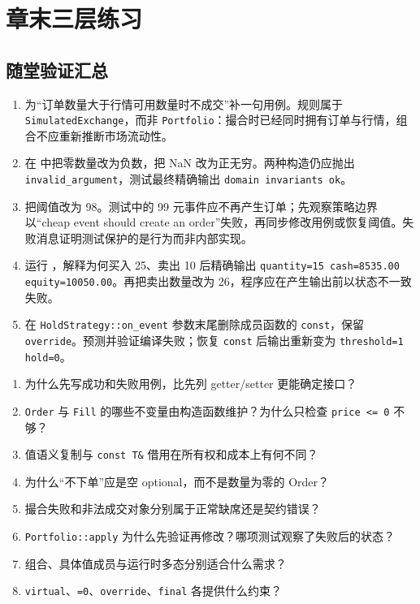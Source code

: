 \section{章末三层练习}

\subsection*{随堂验证汇总}

\begin{enumerate}
  \item 为“订单数量大于行情可用数量时不成交”补一句用例。规则属于 \texttt{SimulatedExchange}，而非 \texttt{Portfolio}：撮合时已经同时拥有订单与行情，组合不应重新推断市场流动性。
  \item 在  中把零数量改为负数，把 NaN 改为正无穷。两种构造仍应抛出 \texttt{invalid\_argument}，测试最终精确输出 \texttt{domain invariants ok}。
  \item 把阈值改为 98。测试中的 99 元事件应不再产生订单；先观察策略边界以“cheap event should create an order”失败，再同步修改用例或恢复阈值。失败消息证明测试保护的是行为而非内部实现。
  \item 运行 ，解释为何买入 25、卖出 10 后精确输出 \texttt{quantity=15 cash=8535.00 equity=10050.00}。再把卖出数量改为 26，程序应在产生输出前以状态不一致失败。
  \item 在 \texttt{HoldStrategy::on\_event} 参数末尾删除成员函数的 \texttt{const}，保留 \texttt{override}。预测并验证编译失败；恢复 \texttt{const} 后输出重新变为 \texttt{threshold=1 hold=0}。
\end{enumerate}

\begin{enumerate}
  \item 为什么先写成功和失败用例，比先列 getter/setter 更能确定接口？
  \item \texttt{Order} 与 \texttt{Fill} 的哪些不变量由构造函数维护？为什么只检查 \texttt{price <= 0} 不够？
  \item 值语义复制与 \texttt{const T\&} 借用在所有权和成本上有何不同？
  \item 为什么“不下单”应是空 optional，而不是数量为零的 Order？
  \item 撮合失败和非法成交对象分别属于正常缺席还是契约错误？
  \item \texttt{Portfolio::apply} 为什么先验证再修改？哪项测试观察了失败后的状态？
  \item 组合、具体值成员与运行时多态分别适合什么需求？
  \item \texttt{virtual}、\texttt{=0}、\texttt{override}、\texttt{final} 各提供什么约束？
\end{enumerate}

